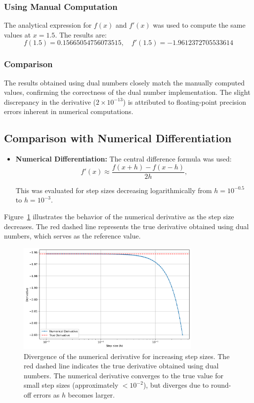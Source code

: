 \documentclass[a4paper,12pt]{article}
\begin{document}
\subsubsection{Using Manual Computation}
The analytical expression for \(f(x)\) and \(f'(x)\) was used to compute the same values at \(x = 1.5\). The results are:
\[
f(1.5) = 0.15665054756073515, \quad f'(1.5) = -1.9612372705533614
\]

\subsubsection{Comparison}
The results obtained using dual numbers closely match the manually computed values, confirming the correctness of the dual number implementation. The slight discrepancy in the derivative (\(2 \times 10^{-13}\)) is attributed to floating-point precision errors inherent in numerical computations.

\subsection{Comparison with Numerical Differentiation}

\begin{itemize}
    \item \textbf{Numerical Differentiation:} The central difference formula was used:
    \begin{equation}
        f'(x) \approx \frac{f(x + h) - f(x - h)}{2h},
        \label{eq:central_difference}
    \end{equation}
    
    This was evaluated for step sizes decreasing logarithmically from \(h = 10^{-0.5}\) to \(h = 10^{-3}\).
\end{itemize}

Figure~\ref{fig:convergence_derivative} illustrates the behavior of the numerical derivative as the step size decreases. The red dashed line represents the true derivative obtained using dual numbers, which serves as the reference value.

\begin{figure}[h!]
    \centering
    \includegraphics[width=0.8\textwidth]{convergence_derivative.png}
    \caption{Divergence of the numerical derivative for increasing step sizes. The red dashed line indicates the true derivative obtained using dual numbers. The numerical derivative converges to the true value for small step sizes (approximately \(< 10^{-2}\)), but diverges due to round-off errors as \(h\) becomes larger.}
    \label{fig:convergence_derivative}
\end{figure}
\end{document}

